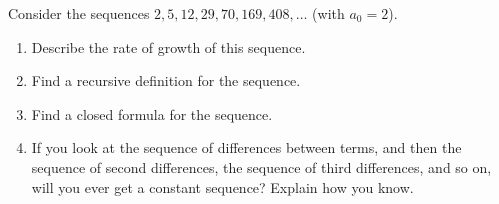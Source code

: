 \documentclass[11pt,]{book}
\theoremstyle{ptxplainnotitle}
\theoremstyle{ptxplaintitle}
\theoremstyle{ptxdefinitionnotitle}
\theoremstyle{ptxdefinitiontitle}
\theoremstyle{ptxdefinitionnotitle}
\theoremstyle{ptxdefinitiontitle}
\theoremstyle{ptxdefinitionnotitle}
\theoremstyle{ptxdefinitiontitle}
\theoremstyle{ptxdefinitiontitlenonumber}
\theoremstyle{ptxdefinitiontitlenonumber}
\numberwithin{equation}{chapter}
\begin{document}
\begin{divisionexercise}{13}\hypertarget{exercise-41}{}
\hypertarget{p-410}{}%
Consider the sequences \(2, 5, 12, 29, 70, 169, 408,\ldots\) (with \(a_0 = 2\)). \leavevmode%
\begin{enumerate}[label=(\alph*)]
\item\hypertarget{li-217}{}\hypertarget{p-411}{}%
Describe the rate of growth of this sequence. %
\item\hypertarget{li-218}{}\hypertarget{p-412}{}%
Find a recursive definition for the sequence. %
\item\hypertarget{li-219}{}\hypertarget{p-413}{}%
Find a closed formula for the sequence. %
\item\hypertarget{li-220}{}\hypertarget{p-414}{}%
If you look at the sequence of differences between terms, and then the sequence of second differences, the sequence of third differences, and so on, will you ever get a constant sequence? Explain how you know. %
\end{enumerate}
%
\end{divisionexercise}%
\typeout{************************************************}
\typeout{************************************************}
\end{document}
